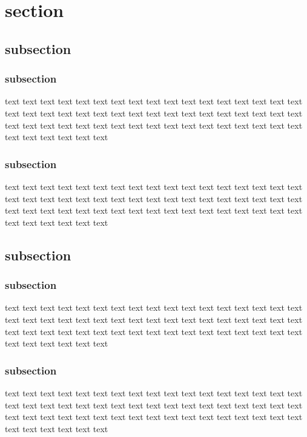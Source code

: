 \documentclass[12pt,a4paper,twoside]{article}
\begin{document}
	\maketitle{}
	\tableofcontents{}
	\newpage{}
	\section{section}
		\subsection{subsection}
			\subsubsection{subsection}
					text text text text text text text text text text text text text text text text text text text text text text text text text text text text text text text text text text text text text text text text text text text text text text text text text text text text text text text text text
			\subsubsection{subsection}
					text text text text text text text text text text text text text text text text text text text text text text text text text text text text text text text text text text text text text text text text text text text text text text text text text text text text text text text text text
		\subsection{subsection}
			\subsubsection{subsection}
					text text text text text text text text text text text text text text text text text text text text text text text text text text text text text text text text text text text text text text text text text text text text text text text text text text text text text text text text text
			\subsubsection{subsection}
					text text text text text text text text text text text text text text text text text text text text text text text text text text text text text text text text text text text text text text text text text text text text text text text text text text text text text text text text text
\end{document}

